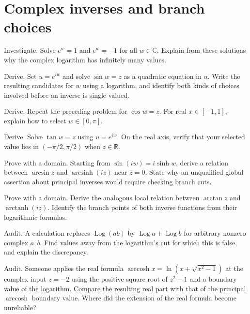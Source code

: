 \documentclass{workbook}
\DeclareMathOperator{\arcsinh}{arcsinh}
\DeclareMathOperator{\arccosh}{arccosh}
\DeclareMathOperator{\arctanh}{arctanh}
\newcommand{\R}{\mathbb{R}}
\newcommand{\C}{\mathbb{C}}
\begin{document}
\section{Complex inverses and branch choices}

\begin{problem}{Investigate.}
Solve $e^w=1$ and $e^w=-1$ for all $w\in\C$. Explain from these
solutions why the complex logarithm has infinitely many values.
\end{problem}

\begin{problem}{Derive.}
Set $u=e^{iw}$ and solve $\sin w=z$ as a quadratic equation in $u$.
Write the resulting candidates for $w$ using a logarithm, and identify
both kinds of choices involved before an inverse is single-valued.
\end{problem}

\begin{problem}{Derive.}
Repeat the preceding problem for $\cos w=z$. For real
$x\in[-1,1]$, explain how to select $w\in[0,\pi]$.
\end{problem}

\begin{problem}{Derive.}
Solve $\tan w=z$ using $u=e^{iw}$. On the real axis, verify that
your selected value lies in $(-\pi/2,\pi/2)$ when $z\in\R$.
\end{problem}

\begin{problem}{Prove with a domain.}
Starting from $\sin(iw)=i\sinh w$, derive a relation between
$\arcsin z$ and $\arcsinh(iz)$ near $z=0$. State why an unqualified
global assertion about principal inverses would require checking
branch cuts.
\end{problem}

\begin{problem}{Prove with a domain.}
Derive the analogous local relation between $\arctan z$ and
$\arctanh(iz)$. Identify the branch points of both inverse
functions from their logarithmic formulas.
\end{problem}

\begin{problem}{Audit.}
A calculation replaces $\operatorname{Log}(ab)$ by
$\operatorname{Log}a+\operatorname{Log}b$ for arbitrary nonzero complex
$a,b$. Find values away from the logarithm's cut for which this is
false, and explain the discrepancy.
\end{problem}

\begin{problem}{Audit.}
Someone applies the real formula
$\arccosh x=\ln(x+\sqrt{x^2-1})$ at the complex input $z=-2$
using the positive square root of $z^2-1$ and a boundary value of the
logarithm. Compare the resulting real part with that of the principal
$\arccosh$ boundary value. Where did the
extension of the real formula become unreliable?
\end{problem}
\end{document}
